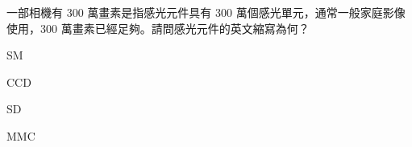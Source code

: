 \ifx\ntpcNinetyTwo\undefined[92學年基北區] \fi
一部相機有 300 萬畫素是指感光元件具有 300 萬個感光單元，通常一般家庭影像使用，300 萬畫素已經足夠。請問感光元件的英文縮寫為何？
  \begin{optionlist}
  \item SM
  \item CCD\label{ntpc-92-a27}
  \item SD
  \item MMC
  \end{optionlist}